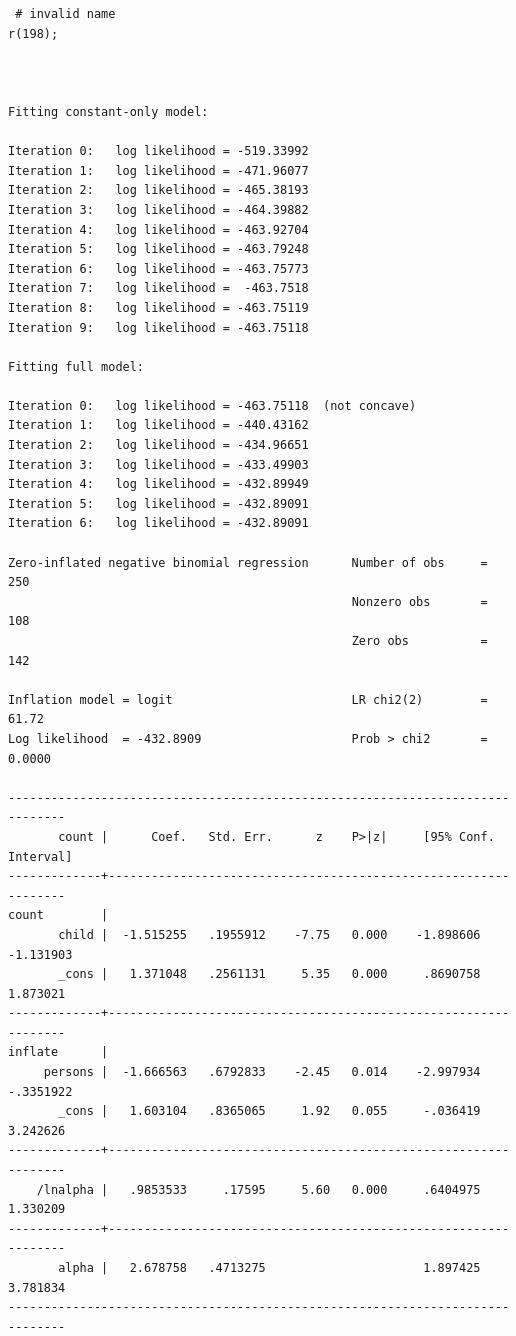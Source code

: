 \documentclass[]{book}
\begin{document}
\begin{verbatim}
 # invalid name
r(198);



Fitting constant-only model:

Iteration 0:   log likelihood = -519.33992  
Iteration 1:   log likelihood = -471.96077  
Iteration 2:   log likelihood = -465.38193  
Iteration 3:   log likelihood = -464.39882  
Iteration 4:   log likelihood = -463.92704  
Iteration 5:   log likelihood = -463.79248  
Iteration 6:   log likelihood = -463.75773  
Iteration 7:   log likelihood =  -463.7518  
Iteration 8:   log likelihood = -463.75119  
Iteration 9:   log likelihood = -463.75118  

Fitting full model:

Iteration 0:   log likelihood = -463.75118  (not concave)
Iteration 1:   log likelihood = -440.43162  
Iteration 2:   log likelihood = -434.96651  
Iteration 3:   log likelihood = -433.49903  
Iteration 4:   log likelihood = -432.89949  
Iteration 5:   log likelihood = -432.89091  
Iteration 6:   log likelihood = -432.89091  

Zero-inflated negative binomial regression      Number of obs     =        250
                                                Nonzero obs       =        108
                                                Zero obs          =        142

Inflation model = logit                         LR chi2(2)        =      61.72
Log likelihood  = -432.8909                     Prob > chi2       =     0.0000

------------------------------------------------------------------------------
       count |      Coef.   Std. Err.      z    P>|z|     [95% Conf. Interval]
-------------+----------------------------------------------------------------
count        |
       child |  -1.515255   .1955912    -7.75   0.000    -1.898606   -1.131903
       _cons |   1.371048   .2561131     5.35   0.000     .8690758    1.873021
-------------+----------------------------------------------------------------
inflate      |
     persons |  -1.666563   .6792833    -2.45   0.014    -2.997934   -.3351922
       _cons |   1.603104   .8365065     1.92   0.055     -.036419    3.242626
-------------+----------------------------------------------------------------
    /lnalpha |   .9853533     .17595     5.60   0.000     .6404975    1.330209
-------------+----------------------------------------------------------------
       alpha |   2.678758   .4713275                      1.897425    3.781834
------------------------------------------------------------------------------
\end{verbatim}
\end{document}
